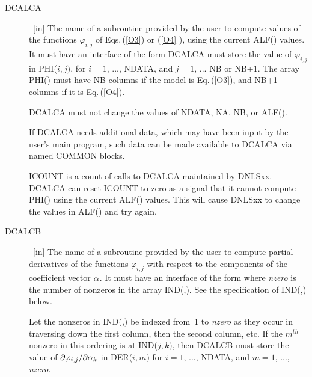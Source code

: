 \documentclass[twoside]{MATH77}
\begin{document}
\begin{description}
\item[DCALCA]  \ [in] The name of a subroutine provided by the user to
compute values of the functions $\varphi _{i,j}$ of Eqs.\,(\ref{O3}) or (\ref{O4}%
), using the current ALF() values. It must have an interface of the form
\vspace{-8pt}{\tt \begin{tabbing}
SUBROUTINE DCALCA(NDATA, NA, NB, ALF,\\
\ \ \ \=ICOUNT, PHI)\\
INTEGER NDATA, NA, NB, ICOUNT\\
DOUBLE PRECISION ALF(NA), PHI(NDATA, NB or\\
\>NB+1)
\end{tabbing}}\vspace{-8pt}
DCALCA must store the value of $\varphi _{i,j}$ in PHI($i,j)$, for $i=1$, ...,
NDATA, and $j=1$, ... NB or NB+1. The array PHI() must have NB columns if
the model is Eq.\,(\ref{O3}), and NB+1 columns if it is Eq.\,(\ref{O4}).

DCALCA must not change the values of NDATA, NA, NB, or ALF().

If DCALCA needs additional data, which may have been input by the user's
main program, such data can be made available to DCALCA via named COMMON
blocks.

ICOUNT is a count of calls to DCALCA maintained by DNLSxx. DCALCA can
reset ICOUNT to zero as a signal that it cannot compute PHI() using the
current ALF() values. This will cause DNLSxx to change the values in ALF()
and try again.

\item[DCALCB]  \ [in] The name of a subroutine provided by the user to
compute partial derivatives of the functions $\varphi _{i,j}$ with respect to
the components of the coefficient vector ${\bf \alpha }$. It must have an
interface of the form
\vspace{-8pt}
where {\em nzero} is the number of nonzeros in the array IND(,). See the
specification of IND(,) below.

Let the nonzeros in IND(,) be indexed from~1 to {\em nzero} as they occur in
traversing down the first column, then the second column, etc. If the $%
m^{th} $ nonzero in this ordering is at IND($j,k)$, then DCALCB must store
the value of $\partial \varphi _{i,j}/\partial {\bf \alpha }_k$ in DER($i,m)$
for $i=1$, ..., NDATA, and $m=1$, ..., {\em nzero}.


\end{description}
\end{document}
